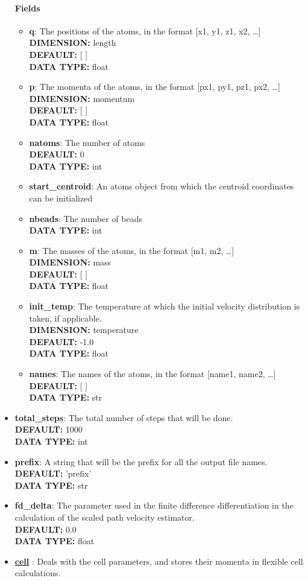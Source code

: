 \begin{itemize}
\paragraph{Fields}
 \begin{itemize}
\item {\bf q}:
 The positions of the atoms, in the format [x1, y1, z1, x2, \ldots  ]
{\\ \bf DIMENSION: }length
{\\ \bf DEFAULT: }[ ]
{\\ \bf DATA TYPE: }float
\item {\bf p}:
 The momenta of the atoms, in the format [px1, py1, pz1, px2, \ldots  ]
{\\ \bf DIMENSION: }momentum
{\\ \bf DEFAULT: }[ ]
{\\ \bf DATA TYPE: }float
\item {\bf natoms}:
 The number of atoms
{\\ \bf DEFAULT: }0
{\\ \bf DATA TYPE: }int
\item {\bf start\_centroid}:
 An atoms object from which the centroid coordinates can be initialized
\item {\bf nbeads}:
 The number of beads
{\\ \bf DATA TYPE: }int
\item {\bf m}:
 The masses of the atoms, in the format [m1, m2, \ldots  ]
{\\ \bf DIMENSION: }mass
{\\ \bf DEFAULT: }[ ]
{\\ \bf DATA TYPE: }float
\item {\bf init\_temp}:
 The temperature at which the initial velocity distribution is taken, if applicable.
{\\ \bf DIMENSION: }temperature
{\\ \bf DEFAULT: }-1.0
{\\ \bf DATA TYPE: }float
\item {\bf names}:
 The names of the atoms, in the format [name1, name2, \ldots  ]
{\\ \bf DEFAULT: }[ ]
{\\ \bf DATA TYPE: }str
\end{itemize}
 
\item {\bf total\_steps}:
 The total number of steps that will be done.
{\\ \bf DEFAULT: }1000
{\\ \bf DATA TYPE: }int
\item {\bf prefix}:
 A string that will be the prefix for all the output file names.
{\\ \bf DEFAULT: }'prefix'
{\\ \bf DATA TYPE: }str
\item {\bf fd\_delta}:
 The parameter used in the finite difference differentiation in the calculation of the scaled path velocity estimator.
{\\ \bf DEFAULT: }0.0
{\\ \bf DATA TYPE: }float
\item {\bf \hyperref[CELL]{cell} }:
 Deals with the cell parameters, and stores their momenta in flexible cell calculations.

\end{itemize}
